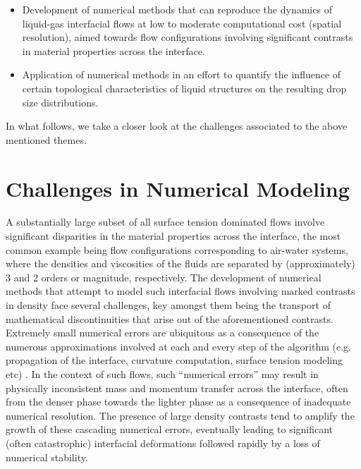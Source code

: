 \begin{itemize}
	\item Development of numerical methods that can reproduce the dynamics of liquid-gas interfacial flows
		at low to moderate computational cost (spatial resolution), aimed towards flow configurations 
		involving significant contrasts in material properties across the interface. 
	\item Application of numerical methods in an effort to quantify the influence of certain topological
		characteristics of liquid structures on the resulting drop size distributions.  
\end{itemize}

In what follows, we take a closer look at the challenges associated to the above mentioned themes. 

\section*{Challenges in Numerical Modeling}

A substantially large subset of all surface tension dominated flows 
involve significant disparities in the material properties across 
the interface, the most common example being flow configurations 
corresponding to air-water systems, where the densities and viscosities
of the fluids are separated by (approximately) 3 and 2 orders or magnitude, respectively.  
The development of numerical methods that attempt to model 
such interfacial flows involving marked contrasts in density  
face several challenges, key amongst them being the transport of 
mathematical discontinuities that arise out of the aforementioned contrasts. 
Extremely small numerical errors are ubiquitous as a consequence of the 
numerous approximations involved at each and every step of the algorithm
(e.g. propagation of the interface, curvature computation, surface tension modeling etc) . 
In the context of such flows, such ``numerical errors'' may result in physically
inconsistent mass and momentum transfer across the interface, often from
the denser phase towards the lighter phase as a consequence of inadequate numerical resolution.
The presence of large density contrasts tend to amplify
the growth of these cascading numerical errors, eventually
leading to significant (often catastrophic) interfacial deformations
followed rapidly by a loss of numerical stability.


